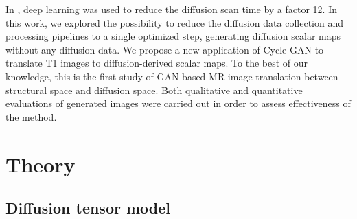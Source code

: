 \documentclass{article}
\begin{document}
%



In \cite{golkov2015q}, deep learning was used to reduce the diffusion scan time by a factor 12.
In this work, we explored the possibility to reduce the diffusion data collection and processing pipelines to a single optimized step, generating diffusion scalar maps without any diffusion data. We propose a new application of Cycle-GAN \cite{zhu2017unpaired} to translate T1 images to diffusion-derived scalar maps. To the best of our knowledge, this is the first study of GAN-based MR image translation between structural space and diffusion space. Both qualitative and quantitative evaluations of generated images were carried out in order to assess effectiveness of the method.



\section{Theory}
\label{sec:format}
\subsection{Diffusion tensor model}
\end{document}
